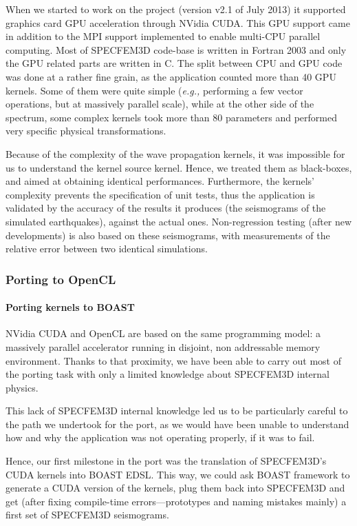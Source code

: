\documentclass{IEEEtran}
\newcommand{\latin}[1]{\textit{#1}}
\newcommand{\eg}{\latin{e.g.,}\xspace}
\begin{document}
When we started to work on the project (version v2.1 of July 2013) it
supported graphics card GPU acceleration through NVidia CUDA. This
GPU support came in addition to the MPI support implemented to enable
multi-CPU parallel computing. Most of SPECFEM3D code-base is written in
Fortran 2003 and only the GPU related parts are written in
C.  The split between CPU and GPU code was done at a rather fine
grain, as the application counted more than 40 GPU kernels. Some of
them were quite simple (\eg performing a few vector operations, but at
massively parallel scale), while at the other side of the spectrum,
some complex kernels took more than 80 parameters and performed very
specific physical transformations.

Because of the complexity of the wave propagation kernels, it was
impossible for us to understand the kernel source kernel. Hence, we
treated them as black-boxes, and aimed at obtaining identical
performances. Furthermore, the kernels' complexity prevents the
specification of unit tests, thus the application is validated by the
accuracy of the results it produces (the seismograms of the simulated
earthquakes), against the actual ones. Non-regression testing (after
new developments) is also based on these seismograms, with
measurements of the relative error between two identical simulations.

\subsubsection{Porting to OpenCL}

\paragraph{Porting kernels to BOAST} 
NVidia CUDA and OpenCL are based on the same programming model: a
massively parallel accelerator running in disjoint, non addressable
memory environment. Thanks to that proximity, we have been able to carry
out most of the porting task with only a limited knowledge about
SPECFEM3D internal physics.

This lack of SPECFEM3D internal knowledge led us to be particularly
careful to the path we undertook for the port, as we would have
been unable to understand how and why the application was not
operating properly, if it was to fail.

Hence, our first milestone in the port was the translation of
SPECFEM3D's CUDA kernels into BOAST EDSL. This way, we could ask BOAST
framework to generate a CUDA version of the kernels, plug them back
into SPECFEM3D and get (after fixing compile-time errors---prototypes
and naming mistakes mainly) a first set of SPECFEM3D seismograms.
\end{document}
